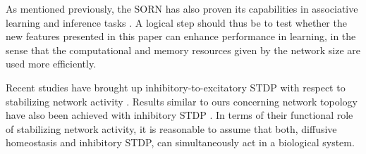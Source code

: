 \documentclass[10pt,letterpaper]{article}
\begin{document}
As mentioned previously, the SORN has also proven its capabilities in associative learning and inference tasks \cite{Hartmann_2016}. A logical step should thus be to test whether the new features presented in this paper can enhance performance in learning, in the sense that the computational and memory resources given by the network size are used more efficiently.

Recent studies have brought up inhibitory-to-excitatory STDP with respect to stabilizing network activity \cite{Vogels_2011,Luz_2012}. Results similar to ours concerning network topology have also been achieved with inhibitory STDP \cite{Effenberger_2015}. In terms of their functional role of stabilizing network activity, it is reasonable to assume that both, diffusive homeostasis and inhibitory STDP, can simultaneously act in a biological system.



\end{document}
